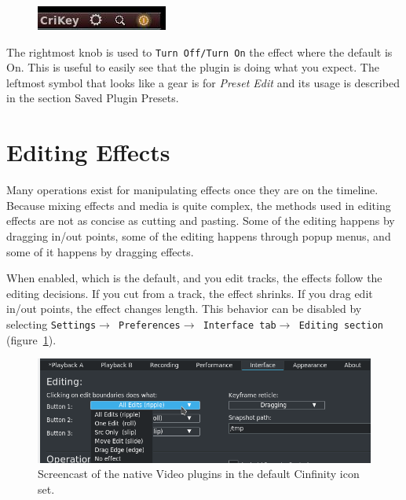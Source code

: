 \begin{figure}
    \vspace{-3ex}
    \centering
    \includegraphics[width=0.7\linewidth]{images/button-options.png} 
\end{figure}

The rightmost knob is used to \texttt{Turn Off/Turn On} the effect where the default is On. This is useful to easily see that the plugin is doing what you expect. The leftmost symbol that looks like a gear is for \textit{Preset Edit} and its usage is described in the section Saved Plugin Presets.

\section{Editing Effects}%
\label{sec:editing_effects}

Many operations exist for manipulating effects once they are on the timeline. Because mixing effects and media is quite complex, the methods used in editing effects are not as concise as cutting and pasting. Some of the editing happens by dragging in/out points, some of the editing happens through popup menus, and some of it happens by dragging effects.

When enabled, which is the default, and you edit tracks, the effects follow the editing decisions. If you cut from a track, the effect shrinks. If you drag edit in/out points, the effect changes length. This behavior can be disabled by selecting \texttt{Settings$\rightarrow$ Preferences$\rightarrow$ Interface tab$\rightarrow$ Editing section} (figure~\ref{fig:editing-effects}).

\begin{figure}[htpb]
    \centering
    \includegraphics[width=0.8\linewidth]{images/editing-effects.png}
    \caption{Screencast of the native Video plugins in the default Cinfinity icon set.}
    \label{fig:editing-effects}
\end{figure}

